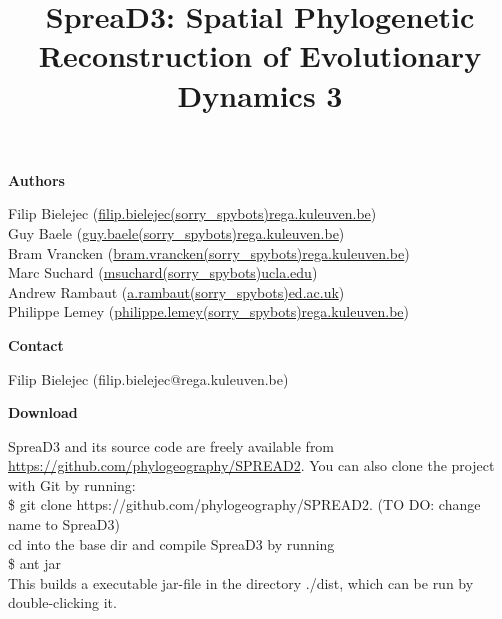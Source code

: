 \documentclass[english]{paper}
\def \spreadname {SpreaD3}
\begin{document}
\title{{\spreadname}: Spatial Phylogenetic Reconstruction of Evolutionary Dynamics 3}
\maketitle

\begin{flushleft}
\textbf{Authors}
\par\end{flushleft}

\noindent
Filip Bielejec (\url{filip.bielejec(sorry_spybots)rega.kuleuven.be}) \\
Guy Baele (\url{guy.baele(sorry_spybots)rega.kuleuven.be}) \\
Bram Vrancken  (\url{bram.vrancken(sorry_spybots)rega.kuleuven.be}) \\
Marc Suchard (\url{msuchard(sorry_spybots)ucla.edu})\\
Andrew Rambaut (\url{a.rambaut(sorry_spybots)ed.ac.uk}) \\
Philippe Lemey (\url{philippe.lemey(sorry_spybots)rega.kuleuven.be}) \\

\begin{flushleft}
\textbf{Contact}
\par\end{flushleft}
Filip Bielejec (filip.bielejec@rega.kuleuven.be) 


\begin{flushleft}
\textbf{Download}
\par\end{flushleft}
SpreaD3 and its source code are freely available from \url{https://github.com/phylogeography/SPREAD2}.
You can also clone the project with Git by running: 
\\\$ git clone https://github.com/phylogeography/SPREAD2. (TO DO: change name to SpreaD3)
\\
cd into the base dir and compile SpreaD3 by running 
\\\$ ant jar
\\
This builds a executable jar-file in the directory ./dist, which can be run by double-clicking it.

\pagebreak{}
\tableofcontents{}
\pagebreak{}
\end{document}
